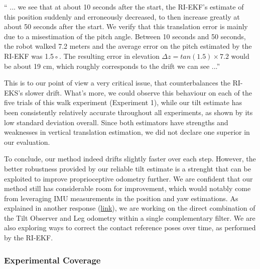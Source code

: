 \begin{quotepaper}
`` ... we see that at about 10 seconds after
the start, the RI-EKF’s estimate of this position suddenly and
erroneously decreased, to then increase greatly at about 50
seconds after the start. We verify that this translation error is
mainly due to a misestimation of the pitch angle. Between
10 seconds and 50 seconds, the robot walked 7.2 meters and
the average error on the pitch estimated by the RI-EKF was
1.5◦. The resulting error in elevation $\Delta z = tan(1.5) \times 7.2$
would be about 19 cm, which roughly corresponds to the drift we can see ...''
\end{quotepaper}

This is to our point of view a very critical issue, that counterbalances the RI-EKS's slower drift. 
What's more, we could observe this behaviour on each of the five trials of this walk experiment (Experiment 1), while our tilt estimate has been consistently relatively accurate throughout all experiments, as shown by its low standard deviation overall.
Since both estimators have strengths and weaknesses in vertical translation estimation, we did not declare one superior in our evaluation.

To conclude, our method indeed drifts slightly faster over each step. However, the better robustness provided by our reliable tilt estimate is a strenght that can be exploited to improve proprioceptive odometry further. We are confident that our method still has considerable room for improvement, which would notably come from leveraging IMU measurements in the position and yaw estimations. As explained in another response (\hyperlink{CommentSe3Fusion}{link}), we are working on the direct combination of the Tilt Observer and Leg odometry within a single complementary filter. We are also exploring ways to correct the contact reference poses over time, as performed by the RI-EKF.



\subsubsection{Experimental Coverage}

